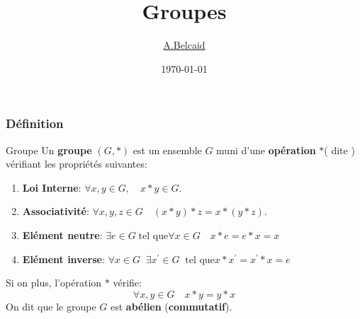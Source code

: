 \documentclass{beamer}
\title{Groupes}
\author{\underline{A.Belcaid}}
\institute{\small Université Euro Méditerranéenne de Fès}
\date{\today}
\begin{document}
\maketitle


\begin{frame}[<+->]
  \frametitle{Définition}
 \begin{block}{Groupe}
   \small
   Un \textbf{\alert{groupe}}  $\left(G, *\right)$ est un ensemble $G$ muni
   d'une \textbf{opération} $\mathbf{*}$( dite ) vérifiant les propriétés suivantes:
   \begin{enumerate}
     \item \alert{\textbf{Loi Interne}}:  $\forall x,y \in G,\quad x*y\in G$.\\[8pt]
     \item \alert{\textbf{Associativité}}: $\forall x, y,z \in G \quad (x*y)*z =
       x*(y*z)$.\\[8pt]
     \item \alert{\textbf{Elément neutre}}: $\exists e\in G\;\text{tel que}
       \forall x \in G\quad x*e = e*x = x$\\[8pt]

     \item \alert{\textbf{Elément inverse}}: $
       \forall x \in G\;\; \exists x^{'}\in G\;\; \text{tel que} x*x^{'} = x^{'}*x = e$\\[8pt]
   \end{enumerate}
 \end{block} 
 Si on plus, l'opération $*$ vérifie:
 \begin{equation}
   \forall x, y\in G\quad x*y = y*x
 \end{equation}
 On dit que le groupe $G$ est \textbf{\alert{abélien}} (\textbf{commutatif}).
\end{frame}
\end{document}
